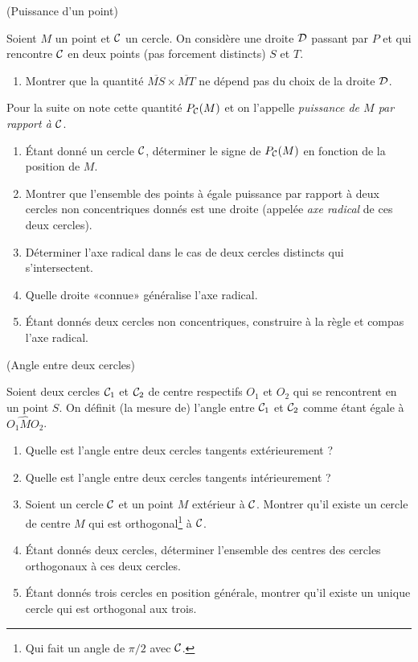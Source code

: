 \documentclass[a4paper,11pt,reqno]{amsart}
\begin{document}
\begin{exo} (Puissance d'un point)

  Soient $M$ un point et $\mathcal{C}$ un cercle. On considère une droite $\mathcal{D}$ passant par $P$ et qui rencontre $\mathcal{C}$ en deux points (pas forcement distincts) $S$ et $T$.
  \begin{enumerate}
    \item Montrer que la quantité $\overline{MS}\times \overline{MT}$ ne dépend pas du choix de la droite $\mathcal{D}$.
  \end{enumerate}
  \begin{convention}
    Pour la suite on note cette quantité $P_{\mathcal{C}}(M)$ et on l'appelle \emph{puissance de $M$ par rapport à $\mathcal{C}$}.
  \end{convention}
  \begin{enumerate}[resume]
    \item Étant donné un cercle $\mathcal{C}$, déterminer le signe de $P_{\mathcal{C}}(M)$ en fonction de la position de $M$.
    \item Montrer que l'ensemble des points à égale puissance par rapport à deux cercles non concentriques donnés est une droite (appelée \emph{axe radical} de ces deux cercles).
    \item Déterminer l'axe radical dans le cas de deux cercles distincts qui s'intersectent.
    \item Quelle droite «connue» généralise l'axe radical.
    \item Étant donnés deux cercles non concentriques, construire à la règle et compas l'axe radical.
  \end{enumerate}
\end{exo}

\begin{exo} (Angle entre deux cercles)

  Soient deux cercles $\mathcal{C}_{1}$ et $\mathcal{C}_{2}$ de centre respectifs $O_{1}$ et $O_{2}$ qui se rencontrent en un point $S$. On définit (la mesure de) l'angle entre $\mathcal{C}_{1}$ et $\mathcal{C}_{2}$ comme étant égale à $\widehat{O_{1}MO_{2}}$.
  \begin{enumerate}
    \item Quelle est l'angle entre deux cercles tangents extérieurement ?
    \item Quelle est l'angle entre deux cercles tangents intérieurement ?
    \item Soient un cercle $\mathcal{C}$ et un point $M$ extérieur à $\mathcal{C}$. Montrer qu'il existe un cercle de centre $M$ qui est orthogonal\footnote{Qui fait un angle de $\pi/2$ avec $\mathcal{C}$.} à $\mathcal{C}$.
    \item Étant donnés deux cercles, déterminer l'ensemble des centres des cercles orthogonaux à ces deux cercles.
    \item Étant donnés trois cercles en position générale, montrer qu'il existe un unique cercle qui est orthogonal aux trois.
  \end{enumerate}
\end{exo}
\end{document}
